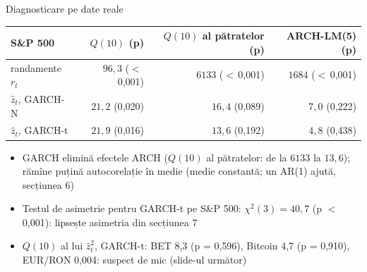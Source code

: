 \begin{frame}{Diagnosticare pe date reale}
\itemsize{\footnotesize}
\begin{center}
\scriptsize
\begin{tabular}{lrrr}
\toprule
S\&P 500 & $Q(10)$ (p) & $Q(10)$ al pătratelor (p) & ARCH-LM(5) (p) \\
\midrule
randamente $r_t$ & $96{,}3$ ($<$\,0{,}001) & $6133$ ($<$\,0{,}001) & $1684$ ($<$\,0{,}001) \\
$\hat z_t$, GARCH-N & $21{,}2$ (0{,}020) & $16{,}4$ (0{,}089) & $7{,}0$ (0{,}222) \\
$\hat z_t$, GARCH-t & $21{,}9$ (0{,}016) & $13{,}6$ (0{,}192) & $4{,}8$ (0{,}438) \\
\bottomrule
\end{tabular}
\end{center}
\begin{itemize}
    \item GARCH elimină efectele ARCH ($Q(10)$ al pătratelor: de la $6133$ la $13{,}6$); rămîne puțină autocorelație în medie (medie constantă; un AR(1) ajută, secțiunea 6)
    \item Testul de asimetrie pentru GARCH-t pe S\&P 500: $\chi^2(3) = 40{,}7$ (p $<$\,0{,}001): lipsește asimetria din secțiunea 7
    \item $Q(10)$ al lui $\hat z_t^2$, GARCH-t: BET 8{,}3 (p = 0{,}596), Bitcoin 4{,}7 (p = 0{,}910), EUR/RON 0{,}004: suspect de mic (slide-ul următor)
\end{itemize}
\end{frame}

